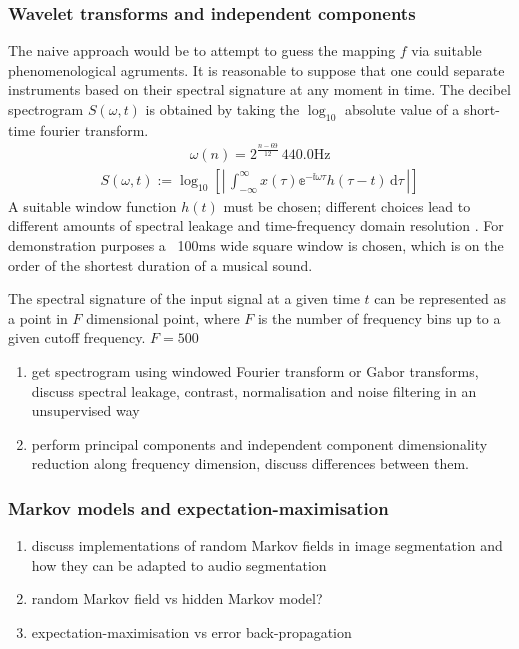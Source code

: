 \documentclass{article}[12pt]
\numberwithin{equation}{section}
\begin{document}
\subsubsection{Wavelet transforms and independent components}
The naive approach would be to attempt to guess the mapping $f$ via suitable
phenomenological agruments. It is reasonable to suppose that one could separate
instruments based on their spectral signature at any moment in time. The decibel
spectrogram $S(\omega,t)$ is obtained by taking the $\log_{10}$ absolute value
of a short-time fourier transform.
\begin{align}
	\omega(n)=2^{\frac{n-69}{12}}\,440.0\mathrm{Hz}
\end{align}
\begin{align}
	S(\omega,t):=\log_{10}\left[\left|\,
	\int_{-\infty}^{\infty}\!
		x(\tau)\mathbb{e}^{-\mathbb{i}\omega \tau}h(\tau-t)
	\,\mathrm{d}\tau
	\,\right|\right]
\end{align}
A suitable window function $h(t)$ must be chosen; different choices lead to
different amounts of spectral leakage and time-frequency domain resolution \cite{}.
For demonstration purposes a ~100ms wide square window is chosen, which is on the
order of the shortest duration of a musical sound.

The spectral signature of the input signal at a given time $t$ can be
represented as a point in $F$ dimensional point, where $F$ is the number
of frequency bins up to a given cutoff frequency. $F=500$

\begin{enumerate}
	\item get spectrogram using windowed Fourier transform or Gabor transforms,
	discuss spectral leakage, contrast, normalisation and noise filtering in an
	unsupervised way
	\item perform principal components and independent component dimensionality
	reduction along frequency dimension, discuss differences between them.
\end{enumerate}
\subsubsection{Markov models and expectation-maximisation}
\begin{enumerate}
	\item discuss implementations of random Markov fields in image segmentation
	and how they can be adapted to audio segmentation
	\item random Markov field vs hidden Markov model?
	\item expectation-maximisation vs error back-propagation
\end{enumerate}
\end{document}
